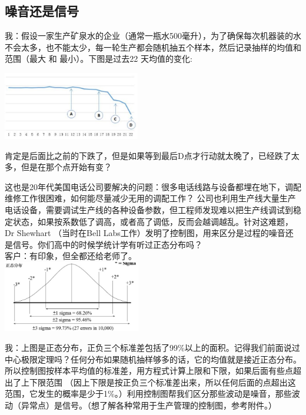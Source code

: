\hypertarget{ux566aux97f3ux8fd8ux662fux4fe1ux53f7}{%
\subsection{噪音还是信号}\label{ux566aux97f3ux8fd8ux662fux4fe1ux53f7}}

我：假设一家生产矿泉水的企业（通常一瓶水500毫升），为了确保每次机器装的水不会太多，也不能太少，每一轮生产都会随机抽五个样本，然后记录抽样的均值和范围（最大
和 最小）。下图是过去22 天均值的变化:


\includegraphics[width=6cm]{DistillWaterCC.jpg}

肯定是后面比之前的下跌了，但是如果等到最后D点才行动就太晚了，已经跌了太多，但是在那个点开始有变？

这也是20年代美国电话公司要解决的问题：很多电话线路与设备都埋在地下，调配维修工作很困难，如何能尽量减少无用的调配工作？
公司也利用生产线大量生产电话设备，需要调试生产线的各种设备参数，但工程师发现难以把生产线调试到稳定状态，如果按系数低了调高，或者高了调低，反而会越调越乱。针对这难题，Dr
Shewhart （当时在Bell
Labs工作）发明了控制图，用来区分是过程的噪音还是信号。你们高中的时候学统计学有听过正态分布吗？\\
客户：有印象，但全都还给老师了。\\

\includegraphics[width=6cm]{NormalDistPicture1.jpg}

我：上图是正态分布，正负三个标准差包括了99\%以上的面积。记得我们前面说过中心极限定理吗？任何分布如果随机抽样够多的话，它的均值就是接近正态分布。所以控制图按样本平均值的标准差，用方程式计算上限和下限，如果后面有些点超出了上下限范围
（因上下限是按正负三个标准差出来，所以任何后面的点超出这范围，它发生的概率是少于1\%。）利用控制图帮我们区分那些波动是噪音，那些波动（异常点）是信号。（想了解各种常用于生产管理的控制图，参考附件。）

